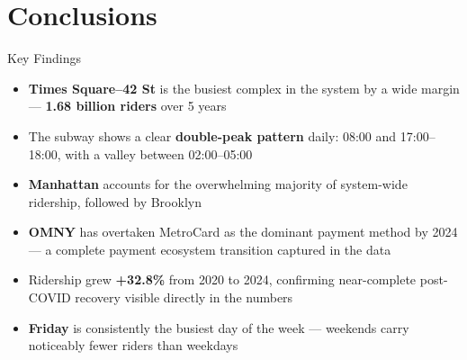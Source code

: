 \documentclass{beamer}
\begin{document}
	\section{Conclusions}
	
	\begin{frame}{Key Findings}
		\vspace{0.2cm}
		\begin{itemize}
			\item \textbf{Times Square--42 St} is the busiest complex in the system
			by a wide margin — \textcolor{mtaYellow}{\textbf{1.68 billion riders}}
			over 5 years
			\vspace{0.2cm}
			\item The subway shows a clear \textbf{double-peak pattern} daily:
			08:00 and 17:00--18:00, with a valley between 02:00--05:00
			\vspace{0.2cm}
			\item \textbf{Manhattan} accounts for the overwhelming majority of
			system-wide ridership, followed by Brooklyn
			\vspace{0.2cm}
			\item \textbf{OMNY} has overtaken MetroCard as the dominant payment
			method by 2024 — a complete payment ecosystem transition
			captured in the data
			\vspace{0.2cm}
			\item Ridership grew \textbf{+32.8\%} from 2020 to 2024, confirming
			near-complete post-COVID recovery visible directly in the numbers
			\vspace{0.2cm}
			\item \textbf{Friday} is consistently the busiest day of the week —
			weekends carry noticeably fewer riders than weekdays
		\end{itemize}
	\end{frame}
	
\end{document}
